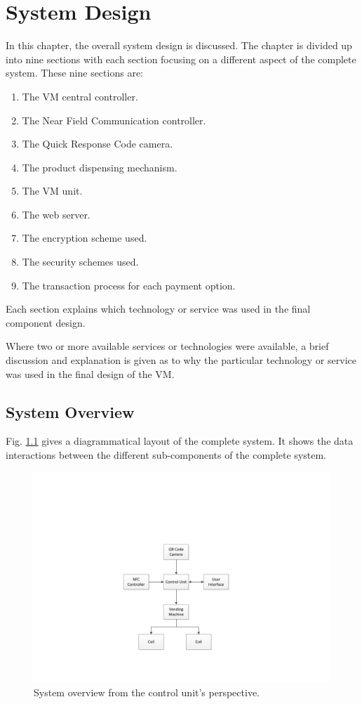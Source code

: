 \chapter{System Design}
\label{chap:3}

In this chapter, the overall system design is discussed. The chapter is divided up into 
nine sections with each section focusing on a different aspect of the complete
system. These nine sections are:

\begin{enumerate}
  \item The VM central controller.
  \item The Near Field Communication controller.
  \item The Quick Response Code camera.
  \item The product dispensing mechanism.
  \item The VM unit.
  \item The web server.
  \item The encryption scheme used.
  \item The security schemes used. 
  \item The transaction process for each payment option. 
\end{enumerate}

Each section explains which technology or service was used in the final
component design.

Where two or more available services or technologies were available,
a brief discussion and explanation is given as to why the particular technology or
service was used in the final design of the VM.

\section{System Overview}

Fig. \ref{fig:system-overview-pi} gives a diagrammatical layout of the complete system.
It shows the data interactions between the different sub-components of the complete
system.

\begin{figure}
\centering
\includegraphics[clip=true, trim = 100 90 0 200, scale=0.7]{pi_system_overview}
\caption{System overview from the control unit's perspective.}
\label{fig:system-overview-pi}
\end{figure}

